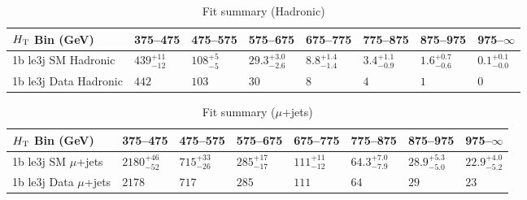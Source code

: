 \documentclass[8pt]{article}
\def\scalht{\mbox{$H_{\rm{T}}$}\xspace}
\newcommand\T{\rule{0pt}{2.6ex}}
\begin{document}
\begin{table}[ht!]
\caption{Fit summary (Hadronic)}
\label{tab:ensemble-summary}
\centering
\begin{tabular}{ llllllll }

\hline
\scalht Bin (GeV)       & 375--475                       & 475--575                       & 575--675                       & 675--775                       & 775--875                       & 875--975                       & 975--$\infty$                  \\ [1.000000ex]
\hline
1b le3j SM Hadronic\T   & $439^{+11}_{-12}$              & $108^{+5}_{-5}$                & $29.3^{+3.0}_{-2.6}$           & $8.8^{+1.4}_{-1.4}$            & $3.4^{+1.1}_{-0.9}$            & $1.6^{+0.7}_{-0.6}$            & $0.1^{+0.1}_{-0.0}$            \\ 
1b le3j Data Hadronic\T & $442$                          & $103$                          & $30$                           & $8$                            & $4$                            & $1$                            & $0$                            \\ 
\hline

\end{tabular}
\end{table}
\begin{table}[ht!]
\caption{Fit summary ($\mu$+jets)}
\label{tab:ensemble-summary}
\centering
\begin{tabular}{ llllllll }

\hline
\scalht Bin (GeV)       & 375--475                       & 475--575                       & 575--675                       & 675--775                       & 775--875                       & 875--975                       & 975--$\infty$                  \\ [1.000000ex]
\hline
1b le3j SM $\mu$+jets\T & $2180^{+46}_{-52}$             & $715^{+33}_{-26}$              & $285^{+17}_{-17}$              & $111^{+11}_{-12}$              & $64.3^{+7.0}_{-7.9}$           & $28.9^{+5.3}_{-5.0}$           & $22.9^{+4.0}_{-5.2}$           \\ 
1b le3j Data $\mu$+jets\T & $2178$                         & $717$                          & $285$                          & $111$                          & $64$                           & $29$                           & $23$                           \\ 
\hline

\end{tabular}
\end{table}
\end{document}
